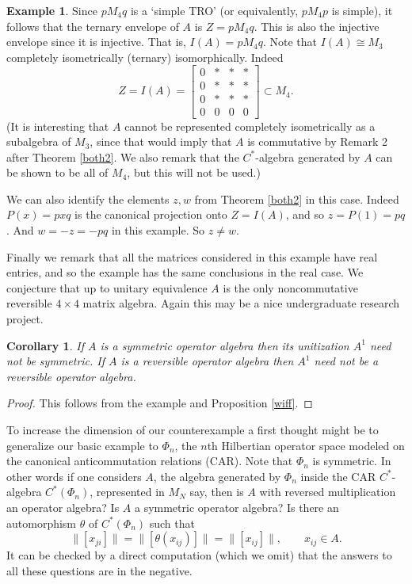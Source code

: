 \documentclass{amsart}
\newtheorem{corollary}[theorem]{Corollary}
\theoremstyle{remark}
\theoremstyle{definition}
\newtheorem{example}[theorem]{Example}
\numberwithin{equation}{section}
\begin{document}
\begin{example}
 Since $p M_4 q$ is a `simple TRO' (or equivalently, $p M_4 p$ is simple), it follows that the ternary envelope of $A$ is $Z = p M_4 q$. 
 This is also the injective envelope since it is injective.    That is, $I(A) = p M_4 q$. 
 Note that $I(A)  \cong M_3$ completely isometrically (ternary) isomorphically.  Indeed 
$$Z = I(A) = \begin{bmatrix} 0 & * & * & *  \\ 0 &   * & * & * \\ 0 &   * & * & * \\ 0 &   0 & 0 & 0  \end{bmatrix}
 \subset M_4.$$
(It is interesting that  $A$ cannot be represented completely isometrically as a subalgebra of $M_3$, since that would imply that $A$ is commutative by Remark 2 after Theorem \ref{both2}.  We also remark that the $C^*$-algebra generated by $A$ can be shown to be  all of $M_4$, but this will not be used.) 

We can also identify the elements $z,w$ from Theorem \ref{both2} in this case.  Indeed $P(x) = pxq$ is the canonical projection onto $Z = I(A)$,
and so $z = P(1) = pq$.  And $w = -z = -pq$ in this example.  So $z \neq w$. 

Finally we remark that all the matrices considered in this example have real entries, and so the example has the same conclusions 
in the real case. 
We conjecture that up to unitary equivalence $A$ is the only noncommutative reversible  $4 \times 4$ matrix algebra.  Again this may be a nice undergraduate research project. 
\end{example}

\begin{corollary}  \label{uni}  If $A$ is a symmetric operator algebra  then its unitization $A^1$ need not be symmetric.
If  $A$ is a reversible operator algebra  then $A^1$ need not be a reversible operator algebra.
 \end{corollary}

\begin{proof}  This follows from the example and 
Proposition \ref{wiff}. 
 \end{proof}




To increase the dimension of our counterexample a first thought might be to 
generalize our basic example to $\Phi_n$, the $n$th Hilbertian operator space modeled on the canonical anticommutation relations (CAR).  Note that  $\Phi_n$ is symmetric. In other words if one considers $A$, the algebra generated by $\Phi_n$ inside the CAR $C^*$-algebra
$C^*(\Phi_n)$, represented in $M_{N}$ say, 
then is $A$ with 
reversed multiplication an operator algebra?   Is $A$ a symmetric  operator algebra?   
Is there an automorphism $\theta$ of $C^*(\Phi_n)$ such that  $$\| [x_{ji} ] \| = \| [ \theta(x_{ij}) ] \| = \| [ x_{ij} ] \| , \qquad x_{ij} \in A .$$
It can be  checked by a direct computation (which we omit) that the answers to all these questions are in the negative.   
\end{document}

